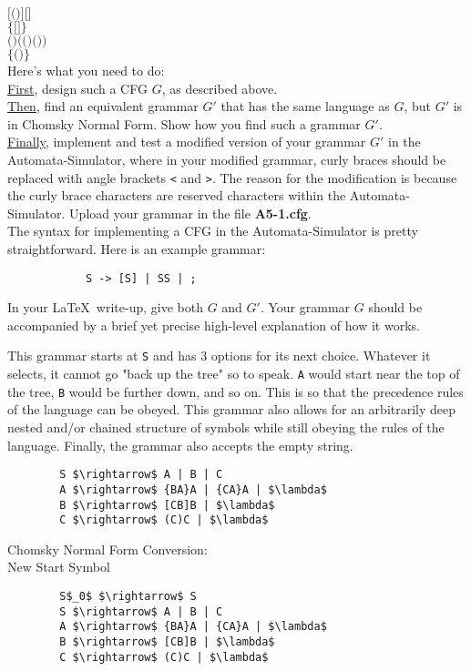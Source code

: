\documentclass[11pt letter]{article}
\begin{document}
\begin{enumerate}
		$\texttt{[()][]}$ \\
		$\texttt{\{[]\}}$ \\
		$\texttt{()(()())}$ \\
		$\texttt{\{()\}}$ \\
		Here's what you need to do: \\
		\underline{First}, design such a CFG $G$, as described above. \\
		\underline{Then}, find an equivalent grammar $G'$ that has the same language as $G$, but $G'$ is in Chomsky Normal Form. Show how you find such a grammar $G'$. \\
		\underline{Finally}, implement and test a modified version of your grammar $G'$ in the Automata-Simulator, where in your modified grammar, curly braces should be replaced with angle brackets \texttt{<} and \texttt{>}. The reason for the modification is because the curly brace characters are reserved characters within the Automata-Simulator. Upload your grammar in the file \textbf{A5-1.cfg}. \\
		The syntax for implementing a CFG in the Automata-Simulator is pretty straightforward. Here is an example grammar: \\
		\begin{verbatim}
			S -> [S] | SS | ;
		\end{verbatim}
		In your \LaTeX\ write-up, give both $G$ and $G'$. Your grammar $G$ should be accompanied by a brief yet precise high-level explanation of how it works. 
	\end{enumerate}
	This grammar starts at {\tt S} and has 3 options for its next choice. Whatever it selects, it cannot go "back up the tree" so to speak. {\tt A} would start near the top of the tree, {\tt B} would be further down, and so on. This is so that the precedence rules of the language can be obeyed. This grammar also allows for an arbitrarily deep nested and/or chained structure of symbols while still obeying the rules of the language. Finally, the grammar also accepts the empty string.
    \begin{lstlisting}
        S $\rightarrow$ A | B | C
        A $\rightarrow$ {BA}A | {CA}A | $\lambda$
        B $\rightarrow$ [CB]B | $\lambda$
        C $\rightarrow$ (C)C | $\lambda$
    \end{lstlisting}
    Chomsky Normal Form Conversion: \\
    New Start Symbol
    \begin{lstlisting}
        S$_0$ $\rightarrow$ S
        S $\rightarrow$ A | B | C
        A $\rightarrow$ {BA}A | {CA}A | $\lambda$
        B $\rightarrow$ [CB]B | $\lambda$
        C $\rightarrow$ (C)C | $\lambda$
    \end{lstlisting}
\end{document}

